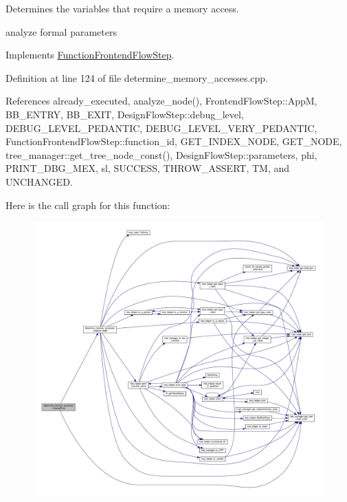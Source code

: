 Determines the variables that require a memory access. 

analyze formal parameters 

Implements \hyperlink{classFunctionFrontendFlowStep_a00612f7fb9eabbbc8ee7e39d34e5ac68}{Function\+Frontend\+Flow\+Step}.



Definition at line 124 of file determine\+\_\+memory\+\_\+accesses.\+cpp.



References already\+\_\+executed, analyze\+\_\+node(), Frontend\+Flow\+Step\+::\+AppM, B\+B\+\_\+\+E\+N\+T\+RY, B\+B\+\_\+\+E\+X\+IT, Design\+Flow\+Step\+::debug\+\_\+level, D\+E\+B\+U\+G\+\_\+\+L\+E\+V\+E\+L\+\_\+\+P\+E\+D\+A\+N\+T\+IC, D\+E\+B\+U\+G\+\_\+\+L\+E\+V\+E\+L\+\_\+\+V\+E\+R\+Y\+\_\+\+P\+E\+D\+A\+N\+T\+IC, Function\+Frontend\+Flow\+Step\+::function\+\_\+id, G\+E\+T\+\_\+\+I\+N\+D\+E\+X\+\_\+\+N\+O\+DE, G\+E\+T\+\_\+\+N\+O\+DE, tree\+\_\+manager\+::get\+\_\+tree\+\_\+node\+\_\+const(), Design\+Flow\+Step\+::parameters, phi, P\+R\+I\+N\+T\+\_\+\+D\+B\+G\+\_\+\+M\+EX, sl, S\+U\+C\+C\+E\+SS, T\+H\+R\+O\+W\+\_\+\+A\+S\+S\+E\+RT, TM, and U\+N\+C\+H\+A\+N\+G\+ED.

Here is the call graph for this function\+:
\nopagebreak
\begin{figure}[H]
\begin{center}
\leavevmode
\includegraphics[width=350pt]{dd/d8a/classdetermine__memory__accesses_a28439693ec5dde524cb6ae92d6d8ce28_cgraph}
\end{center}
\end{figure}


